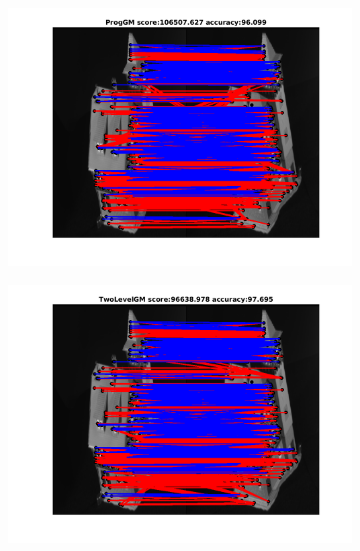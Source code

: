\documentclass[
	fontsize=12pt,
	paper=a4,
	twoside=false,
	numbers=noenddot,
	plainheadsepline,
	toc=listof,
	toc=bibliography
]{scrartcl}
\begin{document}
\begin{figure}[h] 
	\begin{subfigure}[b]{0.3\textwidth}
		\centering
		\includegraphics[scale=0.25]{"fig_ver2608/RealImages/House_seq/no_descr/using_cdf_afftrafo/ext_solution/fi_1_ProgGM"}  
	\end{subfigure}%
	\begin{subfigure}[b]{0.3\textwidth}
		\centering
		\includegraphics[scale=0.25]{"fig_ver2608/RealImages/House_seq/no_descr/using_cdf_afftrafo/ext_solution/fi_1_TwoLevelGM"}  
	\end{subfigure} 
	\begin{subfigure}[b]{0.3\textwidth}
		\centering

\end{subfigure}
\end{figure}
\end{document}
